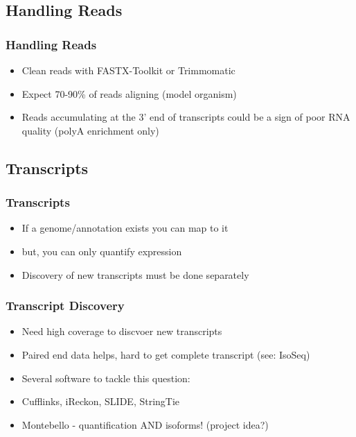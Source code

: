 \documentclass[14pt]{beamer}
\begin{document}
\subsection{Handling Reads}

\begin{frame}
\frametitle{Handling Reads}
\begin{itemize}
	\item<1-> Clean reads with FASTX-Toolkit or Trimmomatic
	\item<2-> Expect 70-90\% of reads aligning (model organism)
	\item<3-> Reads accumulating at the 3' end of transcripts could be a sign of poor RNA quality (polyA enrichment only)
\end{itemize}
\end{frame}

\subsection{Transcripts}
\begin{frame}
\frametitle{Transcripts}
\begin{itemize}
	\item<1-> If a genome/annotation exists you can map to it
	\item<2-> but, you can only quantify expression
	\item<3-> Discovery of new transcripts must be done separately
\end{itemize}
\end{frame}

\begin{frame}
\frametitle{Transcript Discovery}
\begin{itemize}
	\item<1-> Need high coverage to discvoer new transcripts
	\item<2-> Paired end data helps, hard to get complete transcript (see: IsoSeq)
	\item<3-> Several software to tackle this question:
	\item<4-> Cufflinks, iReckon, SLIDE, StringTie
	\item<5-> Montebello - quantification AND isoforms! (project idea?)
\end{itemize}
\end{frame}
\end{document}
